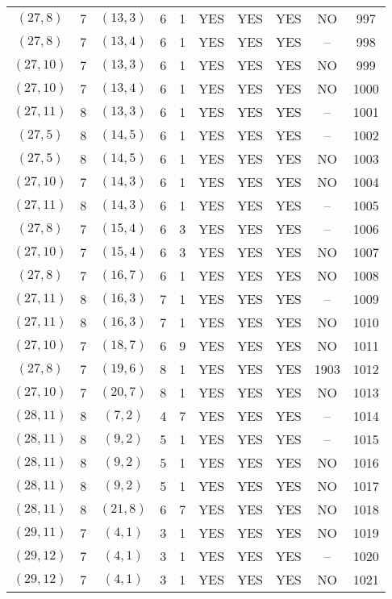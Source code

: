 \begin{longtable}{|c|c|c|c|c|c|c|c|c|c|}
$(27, 8)$ & 7 & $(13, 3)$ & 6 & 1 & YES & YES & YES & NO & 997\\
$(27, 8)$ & 7 & $(13, 4)$ & 6 & 1 & YES & YES & YES & -- & 998\\
$(27, 10)$ & 7 & $(13, 3)$ & 6 & 1 & YES & YES & YES & NO & 999\\
$(27, 10)$ & 7 & $(13, 4)$ & 6 & 1 & YES & YES & YES & NO & 1000\\
$(27, 11)$ & 8 & $(13, 3)$ & 6 & 1 & YES & YES & YES & -- & 1001\\
$(27, 5)$ & 8 & $(14, 5)$ & 6 & 1 & YES & YES & YES & -- & 1002\\
$(27, 5)$ & 8 & $(14, 5)$ & 6 & 1 & YES & YES & YES & NO & 1003\\
$(27, 10)$ & 7 & $(14, 3)$ & 6 & 1 & YES & YES & YES & NO & 1004\\
$(27, 11)$ & 8 & $(14, 3)$ & 6 & 1 & YES & YES & YES & -- & 1005\\
$(27, 8)$ & 7 & $(15, 4)$ & 6 & 3 & YES & YES & YES & -- & 1006\\
$(27, 10)$ & 7 & $(15, 4)$ & 6 & 3 & YES & YES & YES & NO & 1007\\
$(27, 8)$ & 7 & $(16, 7)$ & 6 & 1 & YES & YES & YES & NO & 1008\\
$(27, 11)$ & 8 & $(16, 3)$ & 7 & 1 & YES & YES & YES & -- & 1009\\
$(27, 11)$ & 8 & $(16, 3)$ & 7 & 1 & YES & YES & YES & NO & 1010\\
$(27, 10)$ & 7 & $(18, 7)$ & 6 & 9 & YES & YES & YES & NO & 1011\\
$(27, 8)$ & 7 & $(19, 6)$ & 8 & 1 & YES & YES & YES & 1903 & 1012\\
$(27, 10)$ & 7 & $(20, 7)$ & 8 & 1 & YES & YES & YES & NO & 1013\\
$(28, 11)$ & 8 & $(7, 2)$ & 4 & 7 & YES & YES & YES & -- & 1014\\
$(28, 11)$ & 8 & $(9, 2)$ & 5 & 1 & YES & YES & YES & -- & 1015\\
$(28, 11)$ & 8 & $(9, 2)$ & 5 & 1 & YES & YES & YES & NO & 1016\\
$(28, 11)$ & 8 & $(9, 2)$ & 5 & 1 & YES & YES & YES & NO & 1017\\
$(28, 11)$ & 8 & $(21, 8)$ & 6 & 7 & YES & YES & YES & NO & 1018\\
$(29, 11)$ & 7 & $(4, 1)$ & 3 & 1 & YES & YES & YES & NO & 1019\\
$(29, 12)$ & 7 & $(4, 1)$ & 3 & 1 & YES & YES & YES & -- & 1020\\
$(29, 12)$ & 7 & $(4, 1)$ & 3 & 1 & YES & YES & YES & NO & 1021\\

\end{longtable}
